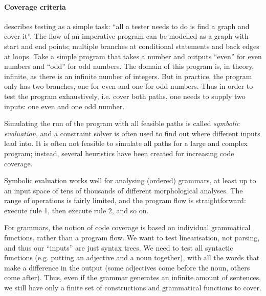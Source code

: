 

\paragraph{Coverage criteria}

\citet{beizer2003software} describes testing as a
simple task: ``all a tester needs to do is find a graph and cover
it''. The flow of an imperative program can be modelled as a graph
with start and end points; multiple branches at conditional statements
and back edges at loops. Take a simple program that takes a number and
outputs ``even'' for even numbers and ``odd'' for odd numbers. The domain of this program is, in theory, infinite, as there is an infinite number of integers. But in practice, the program only has two branches, one for even and one for odd numbers. Thus in order to test the program exhaustively, i.e. cover both paths, one needs to supply two inputs: one even and one odd number.

Simulating the run of the program with all feasible paths is called
\emph{symbolic evaluation}, and a constraint solver is often used to
find out where different inputs lead into. It is often not feasible to
simulate all paths for a large and complex program; instead, several
heuristics have been created for increasing code coverage.

Symbolic evaluation works well for analysing (ordered) \onlycg{} grammars, at
least up to an input space of tens of thousands of different
morphological analyses. The range of operations is fairly limited, and
the program flow is straightforward: execute rule 1, then execute
rule 2, and so on.

For \gf{} grammars, the notion of code coverage is based on individual
grammatical functions, rather than a program flow. We want to test
linearisation, not parsing, and thus our ``inputs'' are just syntax
trees.  We need to test all syntactic functions (e.g. putting an
adjective and a noun together), with all the words that make a
difference in the output (some adjectives come before the noun, others
come after). Thus, even if the grammar generates an infinite amount of
sentences, we still have only a finite set of constructions and
grammatical functions to cover.



